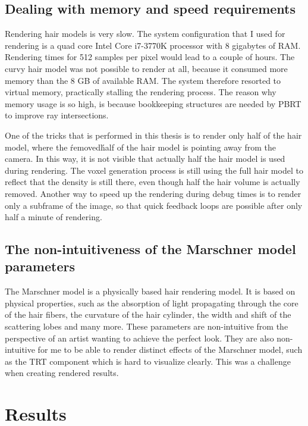 \documentclass[11pt,a4paper]{report}
\begin{document}
\section{Dealing with memory and speed requirements}
\label{sec_memory_requirements}

Rendering hair models is very slow. The system configuration that I used for rendering is a quad core Intel Core i7-3770K processor with 8 gigabytes of RAM. Rendering times for 512 samples per pixel would lead to a couple of hours. The curvy hair model was not possible to render at all, because it consumed more memory than the 8 GB of available RAM. The system therefore resorted to virtual memory, practically stalling the rendering process. The reason why memory usage is so high, is because bookkeeping structures are needed by PBRT to improve ray intersections.

One of the tricks that is performed in this thesis is to render only half of the hair model, where the \'removed\' half of the hair model is pointing away from the camera. In this way, it is not visible that actually half the hair model is used during rendering. The voxel generation process is still using the full hair model to reflect that the density is still there, even though half the hair volume is actually removed. Another way to speed up the rendering during debug times is to render only a subframe of the image, so that quick feedback loops are possible after only half a minute of rendering.

\section{The non-intuitiveness of the Marschner model parameters}
\label{sec_nonintuitiveness_marschner}

The Marschner model is a physically based hair rendering model. It is based on physical properties, such as the absorption of light propagating through the core of the hair fibers, the curvature of the hair cylinder, the width and shift of the scattering lobes and many more. These parameters are non-intuitive from the perspective of an artist wanting to achieve the perfect look. They are also non-intuitive for me to be able to render distinct effects of the Marschner model, such as the TRT component which is hard to visualize clearly. This was a challenge when creating rendered results.


\chapter{Results}
\end{document}

